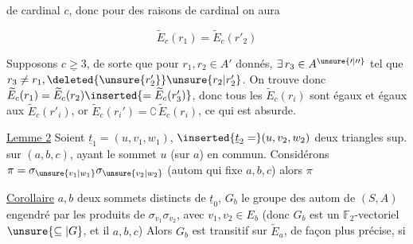 de cardinal $c$, donc pour des raisons de cardinal on aura

\[ \widetilde E_c(r_1)=\widetilde E_c(r'_2) \]

Supposons $\underline{c\geq3}$, de sorte que pour $r_1,r_2\in A'$ donnés,  $\exists\,r_3\in A^{\unsure{\prime|\prime\prime}}$ tel que $r_3\neq r_1,\deleted{\unsure{r_2'}}\unsure{r_2|r'_2}$. On trouve donc $\widetilde E_c(r_1)=\widetilde E_c(r_2)\inserted{=\widetilde E_c(r'_3)}$, donc tous les $\widetilde E_c(r_i)$   sont égaux et égaux aux $\widetilde E_c(r'_i)$, or $\widetilde E_c(r_i')=\complement\,\widetilde E_c(r_i)$, ce qui est absurde.

\uline{Lemme 2} Soient  $\underline t_1=(u,v_1,w_1)$, $\inserted{\underline t_2=}(u,v_2,w_2)$ deux triangles sup. sur $(a,b,c)$, ayant le sommet $u$ (sur $a$) en commun. Considérons $\pi=\sigma_{\unsure{v_1|w_1}}\sigma_{\unsure{v_2|w_2}}$ (autom  qui fixe $a,b,c$) alors $\pi$  

\uline{Corollaire}   $a,b$ deux sommets distincts de $\underline t_0$, $G_b$ le  groupe  des autom de $(S,A)$ engendré par les produits de     $\sigma_{v_1}\sigma_{v_2}$, avec $v_1,v_2\in E_b$  (donc $G_b$ est un  $\mathbb F_2$-vectoriel$\unsure{\subseteq|G}$, et il  $a,b,c$) Alors $G_b$ est transitif sur $\widetilde E_a$, de façon plus précise, si

